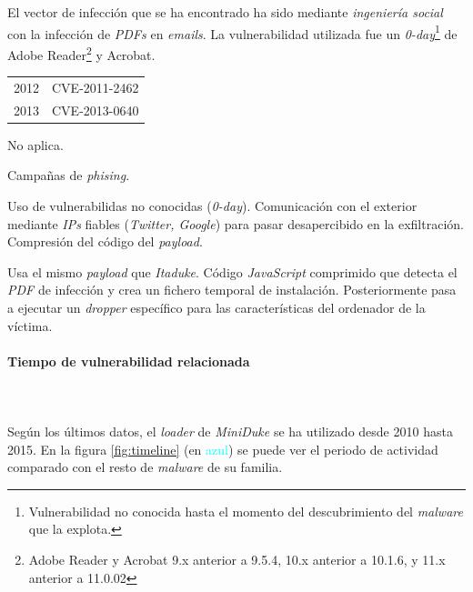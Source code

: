 \documentclass[11pt,a4paper]{article}
\begin{document}
\begin{description}[leftmargin=5.5em,align=right,labelwidth=2cm]
\item[Modo de infección] El vector de infección que se ha encontrado
  ha sido mediante \emph{ingeniería social} con la infección de
  \emph{PDFs} en \emph{emails}. La vulnerabilidad utilizada fue un
  \emph{0-day}\footnote{Vulnerabilidad no conocida hasta el momento
    del descubrimiento del \emph{malware} que la explota.} de Adobe
  Reader\footnote{Adobe Reader y Acrobat 9.x anterior a
    9.5.4, 10.x anterior a 10.1.6, y 11.x anterior a 11.0.02} y Acrobat. \cite{Bitdefender13}\\
  \begin{tabular}[h]{l l}
    2012 & CVE-2011-2462 \\
    2013 & CVE-2013-0640           
  \end{tabular}
\item[Modo de replicación] No aplica.
\item[Modo de propagación] Campañas de \emph{phising}.
\item[Modo de ocultación] Uso de vulnerabilidas no conocidas
  (\emph{0-day}). Comunicación con el exterior mediante \emph{IPs}
  fiables (\emph{Twitter, Google}) para pasar desapercibido en la
  exfiltración. Compresión del código del
  \emph{payload}. \cite[p.~5]{Kaspersky}
\item[Ejecución de la carga] Usa el mismo \emph{payload} que
  \emph{Itaduke}. Código \emph{JavaScript} comprimido que detecta el
  \emph{PDF} de infección y crea un fichero temporal de
  instalación. Posteriormente pasa a ejecutar un \emph{dropper}
  específico para las características del ordenador de la víctima.\cite{Kaspersky}
\end{description}

\paragraph{Tiempo de vulnerabilidad relacionada}~\\\\\qquad Según los
últimos datos, el \emph{loader} de \emph{MiniDuke} se ha utilizado
desde 2010 hasta 2015. \cite{Dukes} En la figura \ref{fig:timeline}
(en \textcolor{cyan}{azul}) se puede ver el periodo de actividad
comparado con el resto de \emph{malware} de su familia.
\end{document}
